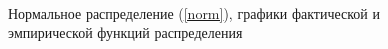 \documentclass[12pt,a4paper]{article}
\begin{document}
{\begin{figure}[htp]
\begin{minipage}[h]{0.3\linewidth}
						\\
					\end{minipage}
					\caption{Нормальное распределение (\ref{norm}), графики фактической и эмпирической функций распределения}
					\label{ris:normal_cum}
				\end{figure}
			}
		
\end{document}
